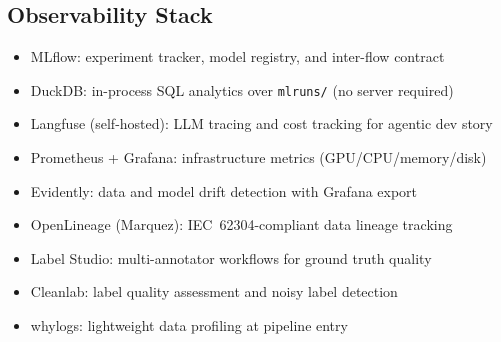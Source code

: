 
\subsection{Observability Stack}
\begin{itemize}
  \item MLflow: experiment tracker, model registry, and inter-flow contract
  \item DuckDB: in-process SQL analytics over \texttt{mlruns/} (no server required)
  \item Langfuse (self-hosted): LLM tracing and cost tracking for agentic dev story
  \item Prometheus + Grafana: infrastructure metrics (GPU/CPU/memory/disk)
  \item Evidently: data and model drift detection with Grafana export
  \item OpenLineage (Marquez): IEC~62304-compliant data lineage tracking
  \item Label Studio: multi-annotator workflows for ground truth quality
  \item Cleanlab: label quality assessment and noisy label detection
  \item whylogs: lightweight data profiling at pipeline entry
\end{itemize}
